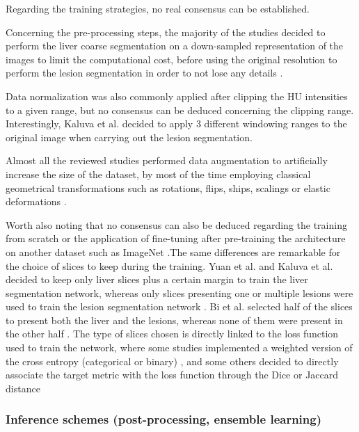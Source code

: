 \documentclass[]{article}
\begin{document}
	Regarding the training strategies, no real consensus can be established.
	
	Concerning the pre-processing steps, the majority of the studies decided
	to perform the liver coarse segmentation on a down-sampled
	representation of the images to limit the computational cost, before
	using the original resolution to perform the lesion segmentation in
	order to not lose any details \cite{Li2018, Han2017, Yuan2017, Kaluva2018, Vorontsov2018}.
	
	Data normalization was also commonly applied after clipping the HU
	intensities to a given range, but no consensus can be deduced concerning
	the clipping range. Interestingly, Kaluva et al. decided to
	apply 3 different windowing ranges to the original image when carrying
	out the lesion segmentation.
	
	Almost all the reviewed studies performed data augmentation to
	artificially increase the size of the dataset, by most of the time
	employing classical geometrical transformations such as rotations,
	flips, ships, scalings or elastic deformations \cite{Frid-adar2017, Ben-Cohen, Rafiei2018, Christ2017, Li2018, Han2017, Yuan2017, Bellver2017, Bi2017, Vorontsov2018}.
	
	Worth also noting that no consensus can also be deduced regarding the
	training from scratch or the application of fine-tuning after
	pre-training the architecture on another dataset such as ImageNet \cite{Bi2017, Bellver2017, Christ2017} .The same differences are remarkable for the choice of slices to
	keep during the training. Yuan et al. and Kaluva et al. decided to keep only liver slices plus a certain margin to train the
	liver segmentation network, whereas only slices presenting one or
	multiple lesions were used to train the lesion segmentation network \cite{Yuan2017, Kaluva2018}.
	Bi et al. selected half of the slices to present both the liver
	and the lesions, whereas none of them were present in the other half \cite{Bi2017}.
	The type of slices chosen is directly linked to the loss function used
	to train the network, where some studies implemented a weighted version
	of the cross entropy (categorical or binary) \cite{Han2017, Bellver2017, Ben-Cohen, Christ2017}, and some others decided to directly associate the target metric
	with the loss function through the Dice or Jaccard distance \cite{Yuan2017, Chlebus2018, Vorontsov2018}
	
	\subsubsection*{Inference schemes (post-processing, ensemble learning)}
	
\end{document}
